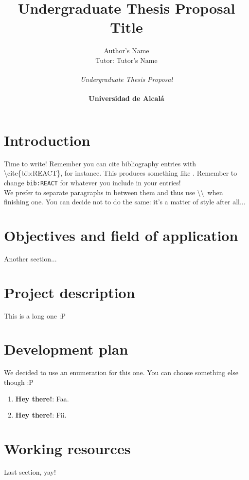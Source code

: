 \documentclass[12pt]{article}
\title{\vspace{-1cm}Undergraduate Thesis Proposal Title}
\author{Author's Name \\ Tutor: Tutor's Name \\ \\ \textit{Undergraduate Thesis Proposal} \\ \\ \textbf{Universidad de Alcalá}}
\date{}
\begin{document}
    \maketitle

    \section{Introduction}
        Time to write! Remember you can cite bibliography entries with \textbackslash cite\{bib:REACT\}, for instance. This produces something like \cite{bib:REACT}. Remember to change \texttt{bib:REACT} for whatever you include in your entries!\\

        We prefer to separate paragraphs in between them and thus use \textbackslash \textbackslash\ when finishing one. You can decide not to do the same: it's a matter of style after all...

    \section{Objectives and field of application}
        Another section...

    \section{Project description}
        This is a long one :P

    \section{Development plan}
        We decided to use an enumeration for this one. You can choose something else though :P

        \begin{enumerate}
            \item \textbf{Hey there!}: Faa.
            \item \textbf{Hey there!}: Fii.
        \end{enumerate}

    \section{Working resources}
        Last section, yay!

    \nocite{*}
    
    {}
\end{document}
